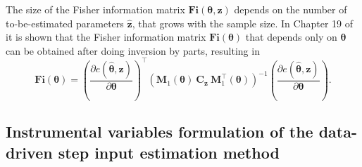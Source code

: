 The size of the Fisher information matrix $\mathbf{Fi}(\bm{\theta}, \mathbf{z})$ depends on the number of to-be-estimated parameters $\widehat{\mathbf{z}}$, that grows with the sample size.
In Chapter 19 of \citet{Pintelon12Book} it is shown that the Fisher information matrix $\mathbf{Fi}(\bm{\theta})$ that depends only on $\bm{\theta}$ can be obtained after doing inversion by parts, resulting in
\begin{equation} \mathbf{Fi}(\bm{\theta}) = \left( \frac{\partial e (\widehat{\bm{\theta}}, \mathbf{z}) }{\partial \bm{\theta} } \right)^\top \left( \mathbf{M}_1( \bm{\theta} ) \ \mathbf{C}_{\mathbf{z}} \ \mathbf{M}_1^\top( \bm{\theta} ) \right)^{-1} \left( \frac{\partial e (\widehat{\bm{\theta}}, \mathbf{z}) }{\partial \bm{\theta} } \right) . \label{eqn:FIM} \end{equation} 

\color{blue}
\subsection{Instrumental variables formulation of the data-driven step input estimation method}


